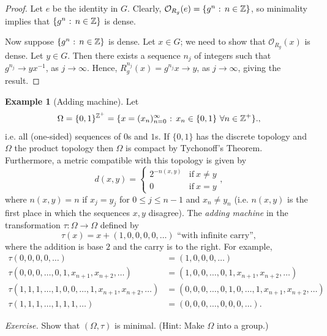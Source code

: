 \documentclass[12pt]{article}
\theoremstyle{definition}
\newtheorem{example}[theorem]{Example}
\theoremstyle{remark}
\begin{document}
\begin{proof}
Let $e$ be the identity in $G$. Clearly, $\mathcal O_{R_g}(e) = \{g^n \hbox{ : } n \in \mathbb Z\}$, so minimality
implies that $\{g^n \hbox{ : } n \in \mathbb Z\}$ is dense.

Now suppose $\{g^n \hbox{ : } n \in \mathbb Z\}$ is dense. 
Let $x \in G$; we need to show that $\mathcal O_{R_g}(x)$ is dense.
Let $y \in G$. Then there exists a sequence $n_j$
of integers such that $g^{n_j} \to yx^{-1}$, as $j \to \infty$.
Hence, $R_g^{n_j}(x) = g^{n_j}x \to y$, as $j \to \infty$, giving the result.
\end{proof}

\begin{example} [Adding machine]
Let 
\[
\Omega = \{0,1\}^{\mathbb Z^+} = \{x = (x_n)_{n=0}^\infty \hbox{ : } x_n \in \{0,1\} \ \forall n\in \mathbb Z^+\}.,
\]
i.e. all (one-sided) sequences of $0$s and $1$s. 
If $\{0,1\}$ has the discrete topology and $\Omega$ the product topology then $\Omega$ is compact by Tychonoff's 
Theorem. Furthermore, a metric compatible with this topology is given by 
\[
d( x,y) =
\begin{cases} 
2^{-n(x,y)} & \text{if}\ x \not=y \\
 0 & \text{if} \ x=y
 \end{cases},
 \]
 where
$n(x,y) =n$ if $x_{j} = y_{j}$ for $0 \le j \leq n-1$ and $x_{n} \not= y_{n}$  
(i.e. $n(x,y)$ is the first place in which the sequences $x,y$ disagree).
The {\it adding machine} in the transformation $\tau : \Omega \to \Omega$ defined by 
\[\tau(x) = x+ (1,0,0,0,0,\ldots) \text{ ``with infinite carry''},
\]
where the addition is base $2$ and the carry is to the right.
For example,
\begin{align*}
\tau(0,0,0,0,\ldots) &=  (1,0,0,0,\ldots) \\
\tau(0,0,0,\ldots,0,1,x_{n+1},x_{n+2},\ldots) &= 
(1,0, 0, \ldots, 0,1,x_{n+1},x_{n+2},\ldots) \\
\tau(1,1,1, \ldots, 1,0, 0, \ldots, 1, x_{n+1},x_{n+2}, \ldots) 
&=  (0,0,0, \ldots,0,1,0,\ldots,1,x_{n+1},x_{n+2},\ldots)
\\
\tau(1,1,1, \ldots, 1,1, 1, \ldots) &=  (0,0,0, \ldots,0,0, 0, \ldots).
\end{align*}
\end{example}

\noindent
{\it Exercise.}
Show that $(\Omega,\tau)$ is minimal. (Hint: Make $\Omega$ into a group.)
\end{document}
